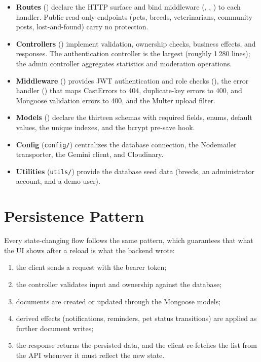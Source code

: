 \begin{itemize}
    \item \textbf{Routes} () declare the HTTP surface and bind
    middleware (, , ) to each
    handler. Public read-only endpoints (pets, breeds, veterinarians,
    community posts, lost-and-found) carry no protection.
    \item \textbf{Controllers} () implement validation,
    ownership checks, business effects, and responses. The authentication
    controller is the largest (roughly 1\,280 lines); the admin controller
    aggregates statistics and moderation operations.
    \item \textbf{Middleware} () provides JWT
    authentication and role checks (), the error handler
    () that maps CastErrors to 404, duplicate-key
    errors to 400, and Mongoose validation errors to 400, and the Multer
    upload filter.
    \item \textbf{Models} () declare the thirteen schemas with
    required fields, enums, default values, the unique indexes, and the bcrypt
    pre-save hook.
    \item \textbf{Config} (\texttt{config/}) centralizes the database
    connection, the Nodemailer transporter, the Gemini client, and Cloudinary.
    \item \textbf{Utilities} (\texttt{utils/}) provide the database seed data
    (breeds, an administrator account, and a demo user).
\end{itemize}

\section{Persistence Pattern}

Every state-changing flow follows the same pattern, which guarantees that what
the UI shows after a reload is what the backend wrote:

\begin{enumerate}
    \item the client sends a request with the bearer token;
    \item the controller validates input and ownership against the database;
    \item documents are created or updated through the Mongoose models;
    \item derived effects (notifications, reminders, pet status transitions)
    are applied as further document writes;
    \item the response returns the persisted data, and the client re-fetches
    the list from the API whenever it must reflect the new state.
\end{enumerate}

